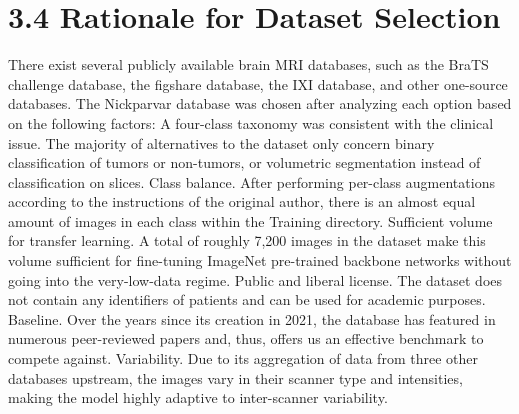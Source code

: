 \documentclass[12pt,a4paper,oneside]{report}
\begin{document}
\section*{3.4 Rationale for Dataset Selection}
There exist several publicly available brain MRI databases, such as the BraTS challenge database, the figshare database, the IXI database, and other one-source databases. The Nickparvar database was chosen after analyzing each option based on the following factors:
A four-class taxonomy was consistent with the clinical issue. The majority of alternatives to the dataset only concern binary classification of tumors or non-tumors, or volumetric segmentation instead of classification on slices.
Class balance. After performing per-class augmentations according to the instructions of the original author, there is an almost equal amount of images in each class within the Training directory.
Sufficient volume for transfer learning. A total of roughly 7,200 images in the dataset make this volume sufficient for fine-tuning ImageNet pre-trained backbone networks without going into the very-low-data regime.
Public and liberal license. The dataset does not contain any identifiers of patients and can be used for academic purposes.
Baseline. Over the years since its creation in 2021, the database has featured in numerous peer-reviewed papers and, thus, offers us an effective benchmark to compete against.
Variability. Due to its aggregation of data from three other databases upstream, the images vary in their scanner type and intensities, making the model highly adaptive to inter-scanner variability.
\end{document}
